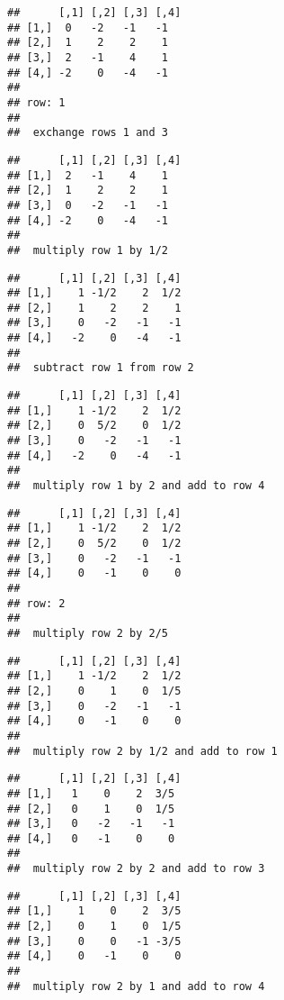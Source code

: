 \documentclass[
  10pt,
  a4paper,
]{article}
\begin{document}
\begin{verbatim}
##      [,1] [,2] [,3] [,4]
## [1,]  0   -2   -1   -1  
## [2,]  1    2    2    1  
## [3,]  2   -1    4    1  
## [4,] -2    0   -4   -1  
## 
## row: 1 
## 
##  exchange rows 1 and 3
\end{verbatim}

\begin{verbatim}
##      [,1] [,2] [,3] [,4]
## [1,]  2   -1    4    1  
## [2,]  1    2    2    1  
## [3,]  0   -2   -1   -1  
## [4,] -2    0   -4   -1  
## 
##  multiply row 1 by 1/2
\end{verbatim}

\begin{verbatim}
##      [,1] [,2] [,3] [,4]
## [1,]    1 -1/2    2  1/2
## [2,]    1    2    2    1
## [3,]    0   -2   -1   -1
## [4,]   -2    0   -4   -1
## 
##  subtract row 1 from row 2
\end{verbatim}

\begin{verbatim}
##      [,1] [,2] [,3] [,4]
## [1,]    1 -1/2    2  1/2
## [2,]    0  5/2    0  1/2
## [3,]    0   -2   -1   -1
## [4,]   -2    0   -4   -1
## 
##  multiply row 1 by 2 and add to row 4
\end{verbatim}

\begin{verbatim}
##      [,1] [,2] [,3] [,4]
## [1,]    1 -1/2    2  1/2
## [2,]    0  5/2    0  1/2
## [3,]    0   -2   -1   -1
## [4,]    0   -1    0    0
## 
## row: 2 
## 
##  multiply row 2 by 2/5
\end{verbatim}

\begin{verbatim}
##      [,1] [,2] [,3] [,4]
## [1,]    1 -1/2    2  1/2
## [2,]    0    1    0  1/5
## [3,]    0   -2   -1   -1
## [4,]    0   -1    0    0
## 
##  multiply row 2 by 1/2 and add to row 1
\end{verbatim}

\begin{verbatim}
##      [,1] [,2] [,3] [,4]
## [1,]   1    0    2  3/5 
## [2,]   0    1    0  1/5 
## [3,]   0   -2   -1   -1 
## [4,]   0   -1    0    0 
## 
##  multiply row 2 by 2 and add to row 3
\end{verbatim}

\begin{verbatim}
##      [,1] [,2] [,3] [,4]
## [1,]    1    0    2  3/5
## [2,]    0    1    0  1/5
## [3,]    0    0   -1 -3/5
## [4,]    0   -1    0    0
## 
##  multiply row 2 by 1 and add to row 4
\end{verbatim}
\end{document}
